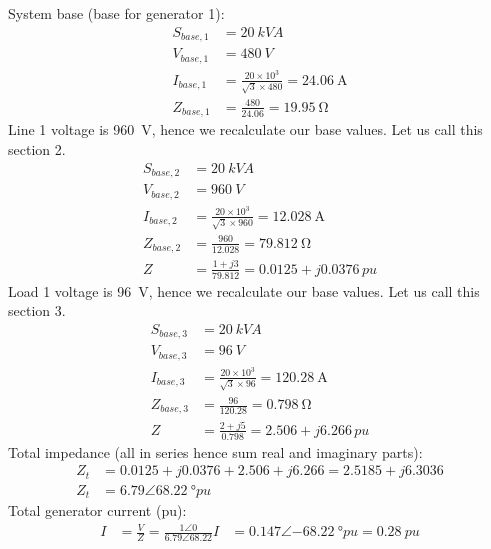 System base (base for generator 1):
\begin{align}
    S_{base,1} & = \SI{20}{kVA}                                                   \\
    V_{base,1} & = \SI{480}{V}                                                    \\
    I_{base,1} & = \frac{20\times 10^3}{\sqrt{3}\times 480} = \SI{24.06}{\ampere} \\
    Z_{base,1} & = \frac{480}{24.06} = \SI{19.95}{\ohm}
\end{align}
Line 1 voltage is \SI{960}{\volt}, hence we recalculate our base values. Let us call this section 2.
\begin{align}
    S_{base,2} & = \SI{20}{kVA}                                                    \\
    V_{base,2} & = \SI{960}{V}                                                     \\
    I_{base,2} & = \frac{20\times 10^3}{\sqrt{3}\times 960} = \SI{12.028}{\ampere} \\
    Z_{base,2} & = \frac{960}{12.028} = \SI{79.812}{\ohm}                          \\
    Z          & = \frac{1+j3}{79.812} = 0.0125 + j0.0376\,\si{pu}
\end{align}
Load 1 voltage is \SI{96}{\volt}, hence we recalculate our base values. Let us call this section 3.
\begin{align}
    S_{base,3} & = \SI{20}{kVA}                                                   \\
    V_{base,3} & = \SI{96}{V}                                                     \\
    I_{base,3} & = \frac{20\times 10^3}{\sqrt{3}\times 96} = \SI{120.28}{\ampere} \\
    Z_{base,3} & = \frac{96}{120.28} = \SI{0.798}{\ohm}                           \\
    Z          & = \frac{2+j5}{0.798} = 2.506+j6.266\,\si{pu}
\end{align}
Total impedance (all in series hence sum real and imaginary parts):
\begin{align}
    Z_t & = 0.0125 + j0.0376 + 2.506 + j6.266 = 2.5185 + j6.3036 \\
    Z_t & = 6.79\angle\SI{68.22}{\degree pu}
\end{align}
Total generator current (pu):
\begin{align}
    I & = \frac{V}{Z} = \frac{1\angle 0}{6.79\angle 68.22}
    I & = 0.147\angle\SI{-68.22}{\degree pu} = \SI{0.28}{pu}
\end{align}
